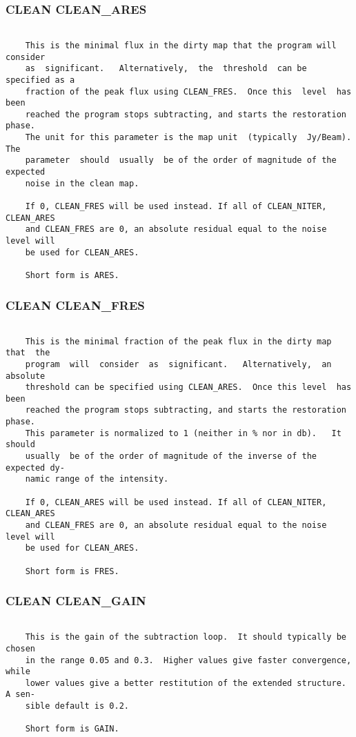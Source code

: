 \subsubsection{CLEAN CLEAN\_ARES}
\begin{verbatim}

    This is the minimal flux in the dirty map that the program will consider
    as  significant.   Alternatively,  the  threshold  can be specified as a
    fraction of the peak flux using CLEAN_FRES.  Once this  level  has  been
    reached the program stops subtracting, and starts the restoration phase.
    The unit for this parameter is the map unit  (typically  Jy/Beam).   The
    parameter  should  usually  be of the order of magnitude of the expected
    noise in the clean map.

    If 0, CLEAN_FRES will be used instead. If all of CLEAN_NITER, CLEAN_ARES
    and CLEAN_FRES are 0, an absolute residual equal to the noise level will
    be used for CLEAN_ARES.

    Short form is ARES.

\end{verbatim}
\subsubsection{CLEAN CLEAN\_FRES}
\begin{verbatim}

    This is the minimal fraction of the peak flux in the dirty map that  the
    program  will  consider  as  significant.   Alternatively,  an  absolute
    threshold can be specified using CLEAN_ARES.  Once this level  has  been
    reached the program stops subtracting, and starts the restoration phase.
    This parameter is normalized to 1 (neither in % nor in db).   It  should
    usually  be of the order of magnitude of the inverse of the expected dy-
    namic range of the intensity.

    If 0, CLEAN_ARES will be used instead. If all of CLEAN_NITER, CLEAN_ARES
    and CLEAN_FRES are 0, an absolute residual equal to the noise level will
    be used for CLEAN_ARES.

    Short form is FRES.

\end{verbatim}
\subsubsection{CLEAN CLEAN\_GAIN}
\begin{verbatim}

    This is the gain of the subtraction loop.  It should typically be chosen
    in the range 0.05 and 0.3.  Higher values give faster convergence, while
    lower values give a better restitution of the extended structure. A sen-
    sible default is 0.2.

    Short form is GAIN.

\end{verbatim}
